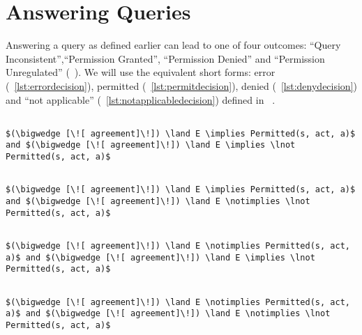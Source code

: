 \section{Answering Queries}

Answering a query as defined earlier can lead to one of four outcomes: ``Query Inconsistent'',``Permission Granted'', ``Permission Denied'' and ``Permission Unregulated'' (~\cite{pucella2006}). We will use the equivalent short forms: error (~\ref{lst:errordecision}), permitted (~\ref{lst:permitdecision}), denied (~\ref{lst:denydecision}) and ``not applicable'' (~\ref{lst:notapplicabledecision}) defined in ~\cite{Tschantz}.

\lstset{mathescape, language=AST} 
\begin{lstlisting}[frame=single, caption={Answerable Queries: Error},label={lst:errordecision}]

$(\bigwedge [\![ agreement]\!]) \land E \implies Permitted(s, act, a)$ and $(\bigwedge [\![ agreement]\!]) \land E \implies \lnot Permitted(s, act, a)$

\end{lstlisting}

\lstset{mathescape, language=AST} 
\begin{lstlisting}[frame=single, caption={Answerable Queries: Permit},label={lst:permitdecision}]

$(\bigwedge [\![ agreement]\!]) \land E \implies Permitted(s, act, a)$ and $(\bigwedge [\![ agreement]\!]) \land E \notimplies \lnot Permitted(s, act, a)$

\end{lstlisting}

\lstset{mathescape, language=AST} 
\begin{lstlisting}[frame=single, caption={Answerable Queries: Deny},label={lst:denydecision}]

$(\bigwedge [\![ agreement]\!]) \land E \notimplies Permitted(s, act, a)$ and $(\bigwedge [\![ agreement]\!]) \land E \implies \lnot Permitted(s, act, a)$

\end{lstlisting}

\lstset{mathescape, language=AST} 
\begin{lstlisting}[frame=single, caption={Answerable Queries: Not Applicable},label={lst:notapplicabledecision}]

$(\bigwedge [\![ agreement]\!]) \land E \notimplies Permitted(s, act, a)$ and $(\bigwedge [\![ agreement]\!]) \land E \notimplies \lnot Permitted(s, act, a)$

\end{lstlisting}






















